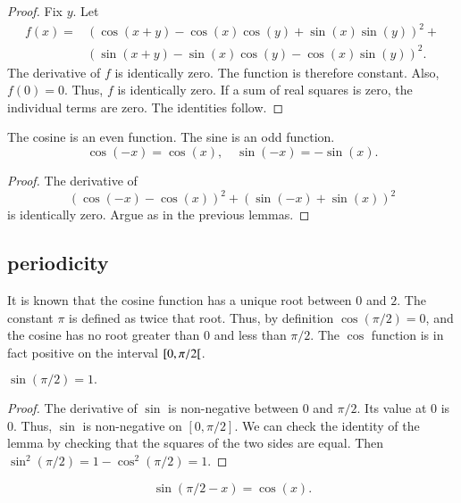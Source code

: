 \begin{proof}
Fix $y$.  Let
    $$\begin{array}{lll}
    f(x) = &(\cos(x+y) - \cos(x)\cos(y) +
    \sin(x)\sin(y))^2 +\\ & (\sin(x+y) -\sin(x)\cos(y) -
    \cos(x)\sin(y))^2.
    \end{array}$$
The derivative of $f$ is identically zero.  The function is
therefore constant. Also, $f(0)=0$.  Thus, $f$ is identically zero.
If a sum of real squares is zero, the individual terms are zero. The
identities follow.
\end{proof}

\begin{lemma}\label{lemma:cos-even}
The cosine is an even function.  The sine is an odd
function.
    $$\cos(-x) = \cos(x),\quad\sin(-x) = -\sin(x).$$
\end{lemma}

\begin{proof}
The derivative of
    $$(\cos(-x) - \cos(x))^2 + (\sin(-x) +\sin(x))^2$$
is identically zero.  Argue as in the previous lemmas.
\end{proof}

\subsection{periodicity}
\label{sec:pi}

It is known that the cosine function has a unique root between $0$
and $2$. The constant $\pi$ is defined as twice that root.  Thus, by
definition $\cos(\pi/2) = 0$, and the cosine has no root greater
than $0$ and less than $\pi/2$. The $\cos$ function is in fact
positive on the interval $[ 0,\pi/2[$.


\begin{lemma}\label{lemma:sin-pi2}
    $\sin (\pi/2) = 1.$
\end{lemma}

\begin{proof}
The derivative of $\sin$ is non-negative between $0$ and $\pi/2$.
Its value at $0$ is $0$.  Thus, $\sin$ is non-negative on
$[0,\pi/2]$.  We can check the identity of the lemma by checking
that the squares of the two sides are equal. Then $\sin^2(\pi/2) =
{1-\cos^2(\pi/2)} = 1$.
\end{proof}

\begin{lemma}\label{lemma:sin-cos}
    $$\sin(\pi/2 - x) = \cos(x).$$
\end{lemma}

